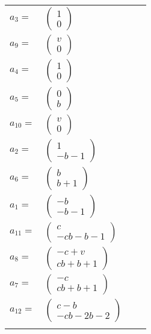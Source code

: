 \documentclass[1p]{elsarticle_modified}
\theoremstyle{definition}
\begin{document}
\begin{tabular}{m{7pt} m{180pt} m{7pt} m{180pt} }
\flushright $a_{3}=$&$\begin{pmatrix}1\\0\end{pmatrix}$ \\
\flushright $a_{9}=$&$\begin{pmatrix}v\\0\end{pmatrix}$ \\
\flushright $a_{4}=$&$\begin{pmatrix}1\\0\end{pmatrix}$ \\
\flushright $a_{5}=$&$\begin{pmatrix}0\\b\end{pmatrix}$ \\
\flushright $a_{10}=$&$\begin{pmatrix}v\\0\end{pmatrix}$ \\
\flushright $a_{2}=$&$\begin{pmatrix}1\\- b-1\end{pmatrix}$ \\
\flushright $a_{6}=$&$\begin{pmatrix}b\\b+1\end{pmatrix}$ \\
\flushright $a_{1}=$&$\begin{pmatrix}- b\\- b-1\end{pmatrix}$ \\
\flushright $a_{11}=$&$\begin{pmatrix}c\\- c b- b-1\end{pmatrix}$ \\
\flushright $a_{8}=$&$\begin{pmatrix}- c+v\\c b+b+1\end{pmatrix}$ \\
\flushright $a_{7}=$&$\begin{pmatrix}- c\\c b+b+1\end{pmatrix}$ \\
\flushright $a_{12}=$&$\begin{pmatrix}c- b\\- c b-2 b-2\end{pmatrix}$\\&\end{tabular}
\end{document}
